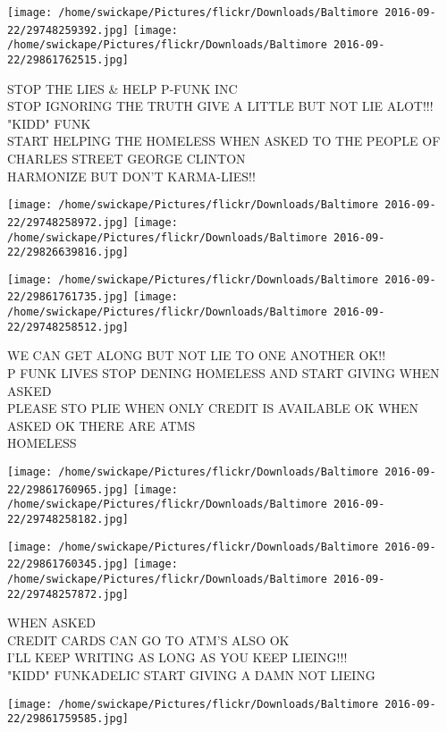 \documentclass[10pt,letterpaper]{article}
\begin{document}
\texttt{[image: /home/swickape/Pictures/flickr/Downloads/Baltimore 2016-09-22/29748259392.jpg]}
\texttt{[image: /home/swickape/Pictures/flickr/Downloads/Baltimore 2016-09-22/29861762515.jpg]}

STOP THE LIES \& HELP P{-}FUNK INC\\
STOP IGNORING THE TRUTH GIVE A LITTLE BUT NOT LIE ALOT!!! "KIDD" FUNK\\
START HELPING THE HOMELESS WHEN ASKED TO THE PEOPLE OF CHARLES STREET GEORGE CLINTON\\
HARMONIZE BUT DON'T KARMA{-}LIES!!\\
\pagebreak

\texttt{[image: /home/swickape/Pictures/flickr/Downloads/Baltimore 2016-09-22/29748258972.jpg]}
\texttt{[image: /home/swickape/Pictures/flickr/Downloads/Baltimore 2016-09-22/29826639816.jpg]}

\texttt{[image: /home/swickape/Pictures/flickr/Downloads/Baltimore 2016-09-22/29861761735.jpg]}
\texttt{[image: /home/swickape/Pictures/flickr/Downloads/Baltimore 2016-09-22/29748258512.jpg]}

WE CAN GET ALONG BUT NOT LIE TO ONE ANOTHER OK!!\\
P FUNK LIVES STOP DENING HOMELESS AND START GIVING WHEN ASKED\\
PLEASE STO PLIE WHEN ONLY CREDIT IS AVAILABLE OK WHEN ASKED OK THERE ARE ATMS\\
HOMELESS\\
\pagebreak

\texttt{[image: /home/swickape/Pictures/flickr/Downloads/Baltimore 2016-09-22/29861760965.jpg]}
\texttt{[image: /home/swickape/Pictures/flickr/Downloads/Baltimore 2016-09-22/29748258182.jpg]}

\texttt{[image: /home/swickape/Pictures/flickr/Downloads/Baltimore 2016-09-22/29861760345.jpg]}
\texttt{[image: /home/swickape/Pictures/flickr/Downloads/Baltimore 2016-09-22/29748257872.jpg]}

WHEN ASKED\\
CREDIT CARDS CAN GO TO ATM'S ALSO OK\\
I'LL KEEP WRITING AS LONG AS YOU KEEP LIEING!!!\\
"KIDD" FUNKADELIC START GIVING A DAMN NOT LIEING\\
\pagebreak

\texttt{[image: /home/swickape/Pictures/flickr/Downloads/Baltimore 2016-09-22/29861759585.jpg]}
\end{document}
